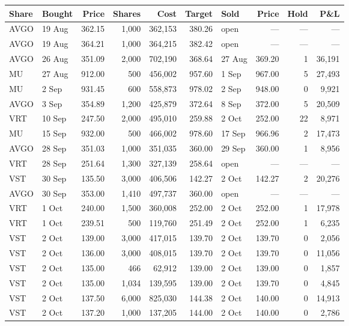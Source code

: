 \documentclass[11pt]{article}
\begin{document}
\begin{center}
\scriptsize
\begin{tabular}{@{}l l r r r r l r r r@{}}
\toprule
\textbf{Share} & \textbf{Bought} & \textbf{Price} & \textbf{Shares} & \textbf{Cost} &
\textbf{Target} & \textbf{Sold} & \textbf{Price} & \textbf{Hold} & \textbf{P\&L} \\
\midrule
AVGO & 19 Aug & 362.15 & 1,000 & 362,153 & 380.26 & open        & ---    & --- & --- \\
AVGO & 19 Aug & 364.21 & 1,000 & 364,215 & 382.42 & open        & ---    & --- & --- \\
AVGO & 26 Aug & 351.09 & 2,000 & 702,190 & 368.64 & 27 Aug      & 369.20 & 1  & 36,191 \\
MU   & 27 Aug & 912.00 &   500 & 456,002 & 957.60 & 1 Sep       & 967.00 & 5  & 27,493 \\
MU   &  2 Sep & 931.45 &   600 & 558,873 & 978.02 & 2 Sep       & 948.00 & 0  &  9,921 \\
AVGO &  3 Sep & 354.89 & 1,200 & 425,879 & 372.64 & 8 Sep       & 372.00 & 5  & 20,509 \\
VRT  & 10 Sep & 247.50 & 2,000 & 495,010 & 259.88 & 2 Oct       & 252.00 & 22 &  8,971 \\
MU   & 15 Sep & 932.00 &   500 & 466,002 & 978.60 & 17 Sep      & 966.96 & 2  & 17,473 \\
AVGO & 28 Sep & 351.03 & 1,000 & 351,035 & 360.00 & 29 Sep      & 360.00 & 1  &  8,956 \\
VRT  & 28 Sep & 251.64 & 1,300 & 327,139 & 258.64 & open        & ---    & --- & --- \\
VST  & 30 Sep & 135.50 & 3,000 & 406,506 & 142.27 & 2 Oct       & 142.27 & 2  & 20,276 \\
AVGO & 30 Sep & 353.00 & 1,410 & 497,737 & 360.00 & open        & ---    & --- & --- \\
VRT  &  1 Oct & 240.00 & 1,500 & 360,008 & 252.00 & 2 Oct       & 252.00 & 1  & 17,978 \\
VRT  &  1 Oct & 239.51 &   500 & 119,760 & 251.49 & 2 Oct       & 252.00 & 1  &  6,235 \\
VST  &  2 Oct & 139.00 & 3,000 & 417,015 & 139.70 & 2 Oct       & 139.70 & 0  &  2,056 \\
VST  &  2 Oct & 136.00 & 3,000 & 408,015 & 139.70 & 2 Oct       & 139.70 & 0  & 11,056 \\
VST  &  2 Oct & 135.00 &   466 &  62,912 & 139.00 & 2 Oct       & 139.00 & 0  &  1,857 \\
VST  &  2 Oct & 135.00 & 1,034 & 139,595 & 139.00 & 2 Oct       & 139.70 & 0  &  4,845 \\
VST  &  2 Oct & 137.50 & 6,000 & 825,030 & 144.38 & 2 Oct       & 140.00 & 0  & 14,913 \\
VST  &  2 Oct & 137.20 & 1,000 & 137,205 & 144.00 & 2 Oct       & 140.00 & 0  &  2,786 \\
\bottomrule
\end{tabular}
\end{center}
\end{document}
